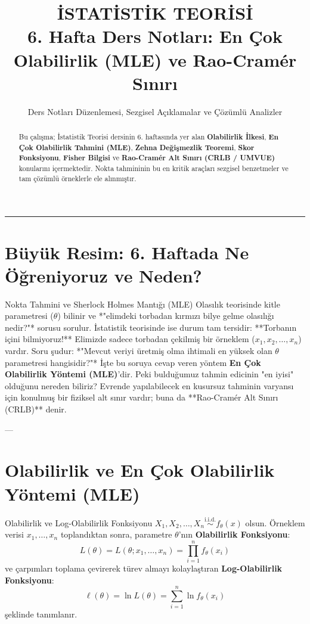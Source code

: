 \documentclass[12pt,a4paper]{article}
\title{\textbf{İSTATİSTİK TEORİSİ}\\[0.3em] \Large 6. Hafta Ders Notları: En Çok Olabilirlik (MLE) ve Rao-Cramér Sınırı}
\author{Ders Notları Düzenlemesi, Sezgisel Açıklamalar ve Çözümlü Analizler}
\date{}
\begin{document}
\maketitle

\begin{abstract}
Bu çalışma; İstatistik Teorisi dersinin 6. haftasında yer alan \textbf{Olabilirlik İlkesi}, \textbf{En Çok Olabilirlik Tahmini (MLE)}, \textbf{Zehna Değişmezlik Teoremi}, \textbf{Skor Fonksiyonu}, \textbf{Fisher Bilgisi} ve \textbf{Rao-Cramér Alt Sınırı (CRLB / UMVUE)} konularını içermektedir. Nokta tahmininin bu en kritik araçları sezgisel benzetmeler ve tam çözümlü örneklerle ele alınmıştır.
\end{abstract}

\hrule
\vspace{1em}

\section{Büyük Resim: 6. Haftada Ne Öğreniyoruz ve Neden?}

\begin{sezgi}{Nokta Tahmini ve Sherlock Holmes Mantığı (MLE)}
Olasılık teorisinde kitle parametresi ($\theta$) bilinir ve *"elimdeki torbadan kırmızı bilye gelme olasılığı nedir?"* sorusu sorulur.  
İstatistik teorisinde ise durum tam tersidir: **Torbanın içini bilmiyoruz!**  
Elimizde sadece torbadan çekilmiş bir örneklem ($x_1, x_2, \dots, x_n$) vardır.  
Soru şudur: *"Mevcut veriyi üretmiş olma ihtimali en yüksek olan $\theta$ parametresi hangisidir?"*  
İşte bu soruya cevap veren yöntem \textbf{En Çok Olabilirlik Yöntemi (MLE)}'dir.  
Peki bulduğumuz tahmin edicinin "en iyisi" olduğunu nereden biliriz? Evrende yapılabilecek en kusursuz tahminin varyansı için konulmuş bir fiziksel alt sınır vardır; buna da **Rao-Cramér Alt Sınırı (CRLB)** denir.
\end{sezgi}

---

\section{Olabilirlik ve En Çok Olabilirlik Yöntemi (MLE)}

\begin{tanim}{Olabilirlik ve Log-Olabilirlik Fonksiyonu}
$X_1, X_2, \dots, X_n \overset{\text{i.i.d.}}{\sim} f_\theta(x)$ olsun. Örneklem verisi $x_1, \dots, x_n$ toplandıktan sonra, parametre $\theta$'nın \textbf{Olabilirlik Fonksiyonu}:
\begin{equation}
    L(\theta) = L(\theta; x_1, \dots, x_n) = \prod_{i=1}^n f_\theta(x_i)
\end{equation}
ve çarpımları toplama çevirerek türev almayı kolaylaştıran \textbf{Log-Olabilirlik Fonksiyonu}:
\begin{equation}
    \ell(\theta) = \ln L(\theta) = \sum_{i=1}^n \ln f_\theta(x_i)
\end{equation}
şeklinde tanımlanır.
\end{tanim}
\end{document}
